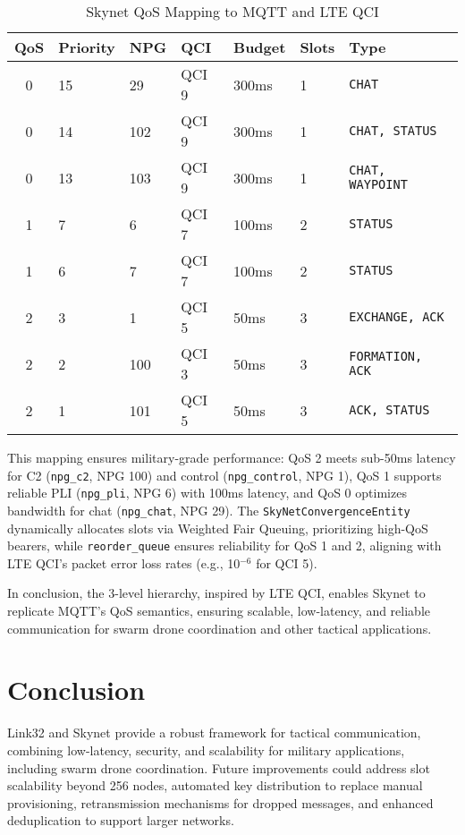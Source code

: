 \documentclass{article}
\begin{document}
\begin{table}[h]
\centering
\caption{Skynet QoS Mapping to MQTT and LTE QCI}
\begin{tabular}{cllllll}
\hline
\textbf{QoS} & \textbf{Priority} & \textbf{NPG} & \textbf{QCI} & \textbf{Budget} & \textbf{Slots} & \textbf{Type} \\
\hline
0 & 15 & 29  & QCI 9 & 300ms & 1 & \texttt{CHAT} \\
0 & 14 & 102 & QCI 9 & 300ms & 1 & \texttt{CHAT, STATUS} \\
0 & 13 & 103 & QCI 9 & 300ms & 1 & \texttt{CHAT, WAYPOINT} \\
1 & 7  & 6   & QCI 7 & 100ms & 2 & \texttt{STATUS} \\
1 & 6  & 7   & QCI 7 & 100ms & 2 & \texttt{STATUS} \\
2 & 3  & 1   & QCI 5 & 50ms  & 3 & \texttt{EXCHANGE, ACK} \\
2 & 2  & 100 & QCI 3 & 50ms  & 3 & \texttt{FORMATION, ACK} \\
2 & 1  & 101 & QCI 5 & 50ms  & 3 & \texttt{ACK, STATUS} \\
\hline
\end{tabular}
\end{table}

This mapping ensures military-grade performance: QoS 2 meets sub-50ms latency for C2 (\texttt{npg\_c2},
NPG 100) and control (\texttt{npg\_control}, NPG 1), QoS 1 supports reliable PLI (\texttt{npg\_pli},
NPG 6) with 100ms latency, and QoS 0 optimizes bandwidth for chat (\texttt{npg\_chat}, NPG 29). The
\texttt{SkyNetConvergenceEntity} dynamically allocates slots via Weighted Fair Queuing, prioritizing
high-QoS bearers, while \texttt{reorder\_queue} ensures reliability for QoS 1 and 2, aligning with
LTE QCI’s packet error loss rates (e.g., 10$^{-6}$ for QCI 5).

In conclusion, the 3-level hierarchy, inspired by LTE QCI, enables Skynet to replicate MQTT’s QoS
semantics, ensuring scalable, low-latency, and reliable communication for swarm drone coordination and
other tactical applications.

\section{Conclusion}
Link32 and Skynet provide a robust framework for tactical communication, combining low-latency,
security, and scalability for military applications, including swarm drone coordination. Future
improvements could address slot scalability beyond 256 nodes, automated key distribution to replace
manual provisioning, retransmission mechanisms for dropped messages, and enhanced deduplication to
support larger networks.
\end{document}
